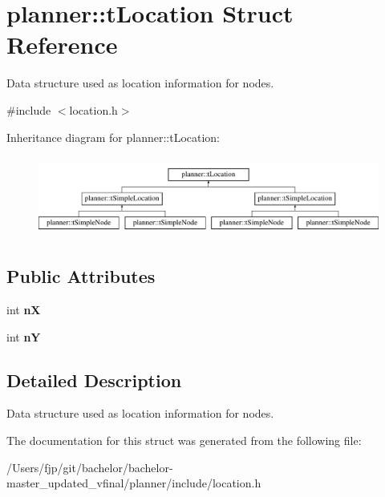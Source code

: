 \hypertarget{structplanner_1_1t_location}{}\section{planner\+:\+:t\+Location Struct Reference}
\label{structplanner_1_1t_location}


Data structure used as location information for nodes.  




{\ttfamily \#include $<$location.\+h$>$}

Inheritance diagram for planner\+:\+:t\+Location\+:\begin{figure}[H]
\begin{center}
\leavevmode
\includegraphics[height=2.675159cm]{structplanner_1_1t_location}
\end{center}
\end{figure}
\subsection*{Public Attributes}
\begin{DoxyCompactItemize}
\item 
\mbox{\label{structplanner_1_1t_location_aca6603f36eb5d71b738ec085080d4f76}} 
int {\bfseries nX}
\item 
\mbox{\label{structplanner_1_1t_location_a83bc1d843b7603e1fc9913001b41421a}} 
int {\bfseries nY}
\end{DoxyCompactItemize}


\subsection{Detailed Description}
Data structure used as location information for nodes. 

The documentation for this struct was generated from the following file\+:\begin{DoxyCompactItemize}
\item 
/\+Users/fjp/git/bachelor/bachelor-\/master\+\_\+updated\+\_\+vfinal/planner/include/location.\+h\end{DoxyCompactItemize}
